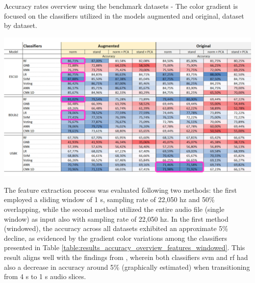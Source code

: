\begin{table}[ht!]
    \caption[Accuracy rates overview using the benchmark datasets - Models augmented x original (Focus on the classifiers dataset by dataset)]{Accuracy rates overview using the benchmark datasets - The color gradient is focused on the classifiers utilized in the models augmented and original, dataset by dataset.}
    \label{table:results_accuracy_overview_classifiers_aug_ori_2}
     \raggedright
    \includegraphics[width=1\textwidth]{resources/images/060-results/Results_classification_overview_aug_x_ori_2.png}
\end{table}

The feature extraction process was evaluated following two methods: the first employed a sliding window of 1 \gls{s}, sampling rate of 22,050 \gls{hz} and 50\% overlapping, while the second method utilized the entire audio file (single window) as input also with sampling rate of 22,050 \gls{hz}. In the first method (windowed), the accuracy across all datasets exhibited an approximate 5\% decline, as evidenced by the gradient color variations among the classifiers presented in Table \ref{table:results_accuracy_overview_features_windowed}. This result aligns well with the findings from \textcite{Salamon2014}, wherein both classifiers \gls{svm} and \gls{rf} had also a decrease in accuracy around 5\% (graphically estimated) when transitioning from 4 \gls{s} to 1 \gls{s} audio slices. 

